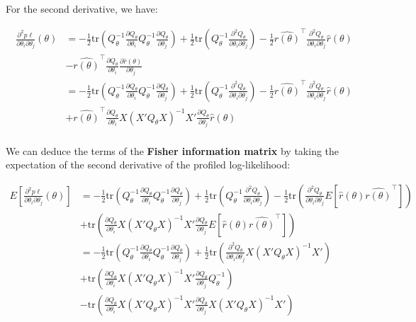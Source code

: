 \documentclass{article}
\begin{document}
 For the second derivative, we have:

 \begin{align*}
\frac{\partial^2 p\ell}{\partial \theta_i\partial\theta_j}(\theta) &= -\frac{1}{2} \mathrm{tr}\left(Q_\theta^{-1} \frac{\partial Q_\theta}{\partial \theta_i} Q_\theta^{-1} \frac{\partial Q_\theta}{\partial \theta_j}\right) +
\frac{1}{2} \mathrm{tr}\left(Q_\theta^{-1} \frac{\partial^2 Q_\theta}{\partial \theta_i\partial\theta_j}\right)-
\frac{1}{2}\hat {r(\theta)}^\top  \frac{\partial^2 Q_\theta}{\partial \theta_i\partial\theta_j} \hat r(\theta)\\
&-\hat {r(\theta)}^\top\frac{\partial Q_\theta}{\partial \theta_i} \frac{\partial\hat r(\theta)}{\partial \theta_j}\\
&= -\frac{1}{2} \mathrm{tr}\left(Q_\theta^{-1} \frac{\partial Q_\theta}{\partial \theta_i} Q_\theta^{-1} \frac{\partial Q_\theta}{\partial \theta_j}\right) +
\frac{1}{2} \mathrm{tr}\left(Q_\theta^{-1} \frac{\partial^2 Q_\theta}{\partial \theta_i\partial\theta_j}\right)-
\frac{1}{2}\hat {r(\theta)}^\top  \frac{\partial^2 Q_\theta}{\partial \theta_i\partial\theta_j} \hat r(\theta)\\
&+\hat {r(\theta)}^\top\frac{\partial Q_\theta}{\partial \theta_i}X{(X'Q_\theta X)}^{-1}X'\frac{\partial Q_\theta}{\partial \theta_j} \hat r(\theta)\\
 \end{align*}

We can deduce the terms of the \textbf{Fisher information matrix} by taking the expectation of the second derivative of the profiled log-likelihood:

\begin{align*}
  E\left[\frac{\partial^2 p\ell}{\partial \theta_i\partial\theta_j}(\theta)\right] &=-\frac{1}{2} \mathrm{tr}\left(Q_\theta^{-1} \frac{\partial Q_\theta}{\partial \theta_i} Q_\theta^{-1} \frac{\partial Q_\theta}{\partial \theta_j}\right) +
  \frac{1}{2} \mathrm{tr}\left(Q_\theta^{-1} \frac{\partial^2 Q_\theta}{\partial \theta_i\partial\theta_j}\right)-
  \frac{1}{2}\mathrm{tr}\left(  \frac{\partial^2 Q_\theta}{\partial \theta_i\partial\theta_j} E\left[\hat r(\theta)\hat {r(\theta)}^\top\right]\right)\\
  &+\mathrm{tr}\left( \frac{\partial Q_\theta}{\partial \theta_i}X{(X'Q_\theta X)}^{-1}X'\frac{\partial Q_\theta}{\partial \theta_j}E\left[ \hat r(\theta)\hat {r(\theta)}^\top\right]\right)\\
  &=-\frac{1}{2} \mathrm{tr}\left(Q_\theta^{-1} \frac{\partial Q_\theta}{\partial \theta_i} Q_\theta^{-1} \frac{\partial Q_\theta}{\partial \theta_j}\right) +
  \frac{1}{2}\mathrm{tr}\left(  \frac{\partial^2 Q_\theta}{\partial \theta_i\partial\theta_j} X{(X'Q_\theta X)}^{-1}X'\right)\\
  &+\mathrm{tr}\left( \frac{\partial Q_\theta}{\partial \theta_i}X{(X'Q_\theta X)}^{-1}X'\frac{\partial Q_\theta}{\partial \theta_j}Q_\theta^{-1}\right)\\
  &-\mathrm{tr}\left( \frac{\partial Q_\theta}{\partial \theta_i}X{(X'Q_\theta X)}^{-1}X'\frac{\partial Q_\theta}{\partial \theta_j}X{(X'Q_\theta X)}^{-1}X'\right)\\
\end{align*}
\end{document}
